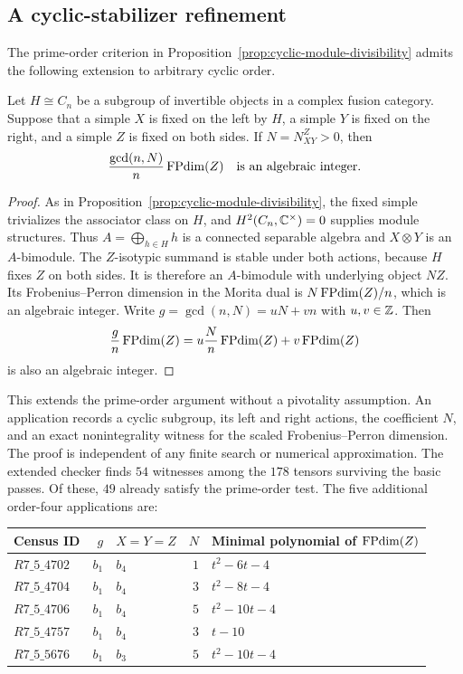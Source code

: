 \subsection{A cyclic-stabilizer refinement}
The prime-order criterion in Proposition~\ref{prop:cyclic-module-divisibility}
admits the following extension to arbitrary cyclic order.
\begin{proposition}\label{prop:m5-cyclic-gcd}
Let $H\cong C_n$ be a subgroup of invertible objects in a complex fusion
category. Suppose that a simple $X$ is fixed on the left by $H$, a
simple $Y$ is fixed on the right, and a simple $Z$ is fixed on both
sides. If $N=N_{XY}^Z>0$, then
\[
 \frac{\gcd(n,N)}{n}\operatorname{FPdim}(Z)
 \quad\text{is an algebraic integer.}
\]
\end{proposition}
\begin{proof}
As in Proposition~\ref{prop:cyclic-module-divisibility}, the fixed
simple trivializes the associator class on $H$, and
$H^2(C_n,\mathbb C^\times)=0$ supplies module structures. Thus
$A=\bigoplus_{h\in H}h$ is a connected separable algebra and
$X\otimes Y$ is an $A$-bimodule.
The $Z$-isotypic summand is stable under both actions, because $H$
fixes $Z$ on both sides. It is therefore an $A$-bimodule with underlying
object $NZ$. Its Frobenius--Perron dimension in the Morita dual is
$N\operatorname{FPdim}(Z)/n$, which is an algebraic integer.
Write $g=\gcd(n,N)=uN+vn$ with $u,v\in\mathbb Z$. Then
\[
 \frac{g}{n}\operatorname{FPdim}(Z)
 =u\frac{N}{n}\operatorname{FPdim}(Z)+v\operatorname{FPdim}(Z)
\]
is also an algebraic integer.
\end{proof}
This extends the prime-order argument without a pivotality assumption.
An application records a cyclic subgroup, its left and right actions,
the coefficient $N$, and an exact nonintegrality witness for the
scaled Frobenius--Perron dimension. The proof is independent of any
finite search or numerical approximation.
The extended checker finds $54$ witnesses among the $178$ tensors
surviving the basic passes. Of these, $49$ already satisfy the
prime-order test. The five additional order-four applications are:
\begin{center}\small
\begin{tabular}{@{}l r l r l@{}}
\toprule
Census ID & $g$ & $X=Y=Z$ & $N$ & Minimal polynomial of $\operatorname{FPdim}(Z)$\\
\midrule
$R7\_5\_4702$ & $b_1$ & $b_4$ & $1$ & $t^2-6t-4$\\
$R7\_5\_4704$ & $b_1$ & $b_4$ & $3$ & $t^2-8t-4$\\
$R7\_5\_4706$ & $b_1$ & $b_4$ & $5$ & $t^2-10t-4$\\
$R7\_5\_4757$ & $b_1$ & $b_4$ & $3$ & $t-10$\\
$R7\_5\_5676$ & $b_1$ & $b_3$ & $5$ & $t^2-10t-4$\\
\bottomrule
\end{tabular}
\end{center}
